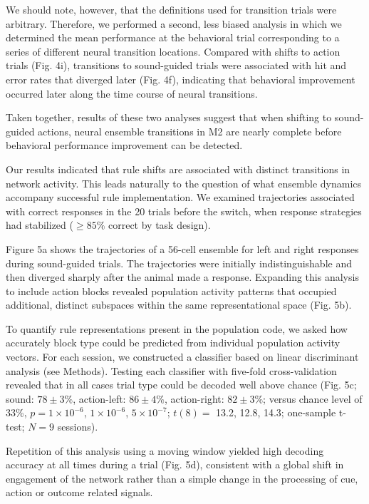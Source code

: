 We should note, however, that the definitions used for transition trials were arbitrary. Therefore, we performed a second, less biased analysis in which we determined the mean performance at the behavioral trial corresponding to a series of different neural transition locations. Compared with shifts to action trials (Fig. 4i), transitions to sound-guided trials were associated with hit and error rates that diverged later (Fig. 4f), indicating that behavioral improvement occurred later along the time course of neural transitions. 

Taken together, results of these two analyses suggest that when shifting to sound-guided actions, neural ensemble transitions in M2 are nearly complete before behavioral performance improvement can be detected.

Our results indicated that rule shifts are associated with distinct transitions in network activity. This leads naturally to the question of what ensemble dynamics accompany successful rule implementation. We examined trajectories associated with correct responses in the 20 trials before the switch, when response strategies had stabilized ($\ge 85\%$ correct by task design). 

Figure 5a shows the trajectories of a 56-cell ensemble for left and right responses during sound-guided trials. The trajectories were initially indistinguishable and then diverged sharply after the animal made a response. Expanding this analysis to include action blocks revealed population activity patterns that occupied additional, distinct subspaces within the same representational space (Fig. 5b).


To quantify rule representations present in the population code, we asked how accurately block type could be predicted from individual population activity vectors. For each session, we constructed a classifier based on linear discriminant analysis (see Methods). Testing each classifier with five-fold cross-validation revealed that in all cases trial type could be decoded well above chance (Fig. 5c; sound: $78 \pm 3\%$, action-left: $86 \pm 4\%$, action-right: $82 \pm 3\%$; versus chance level of 33\%, $p = 1 \times 10^{-6}$, $1 \times 10^{-6}$, $5 \times 10^{-7}$; $t(8) = $ 13.2, 12.8, 14.3; one-sample t-test; $N = 9$ sessions). 

Repetition of this analysis using a moving window yielded high decoding accuracy at all times during a trial (Fig. 5d), consistent with a global shift in engagement of the network rather than a simple change in the processing of cue, action or outcome related signals. 

